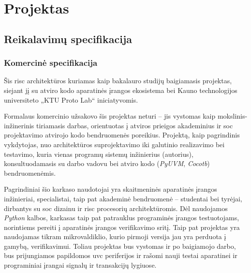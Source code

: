 \section{Projektas}\label{section:project}

\subsection{Reikalavimų specifikacija}

\subsubsection{Komercinė specifikacija}

Šis \gls{risc} architektūros    kuriamas kaip bakalauro studijų baigiamasis projektas, siejant jį su atviro kodo aparatinės įrangos ekosistema bei Kauno technologijos universiteto „KTU Proto Lab“ iniciatyvomis.

Formalaus komercinio užsakovo šis projektas neturi -- jis vystomas kaip mokslinis-inžinerinis tiriamasis darbas, orientuotas į atviros prieigos akademinius ir \gls{soc} projektavimo atvirojo kodo bendruomenės poreikius. Projektą, kaip pagrindinis vykdytojas, nuo architektūros suprojektavimo iki galutinio realizavimo bei testavimo, kuria vienas programų sistemų inžinierius (autorius), konsultuodamasis su darbo vadovu bei atviro kodo (\textit{PyUVM}, \textit{Cocotb}) bendruomenėmis.

Pagrindiniai šio karkaso naudotojai yra skaitmeninės aparatinės įrangos inžinieriai,  specialistai, taip pat akademinė bendruomenė -- studentai bei tyrėjai, dirbantys su \gls{soc} dizainu ir \gls{risc} procesorių architektūromis. Dėl naudojamos \textit{Python} kalbos, karkasas taip pat patrauklus programinės įrangos testuotojams, norintiems pereiti į aparatinės įrangos verifikavimo sritį. Taip pat projektas yra naudojamas tikram mikrovaldiklio, kurio pirmoji versija jau yra perduota į gamybą, verifikavimui. Toliau projektas bus vystomas ir po baigiamojo darbo, bus prijungiamos papildomos \gls{uvc} periferijos ir rašomi nauji testai aparatinei ir programiniai įrangai signalų ir transakcijų lygiuose.

